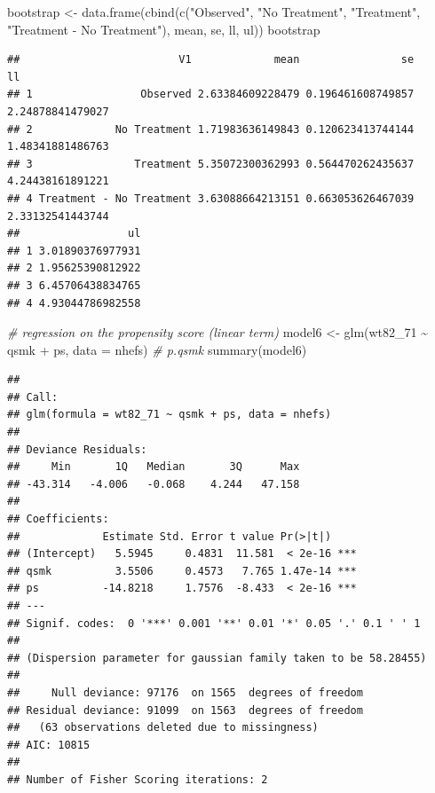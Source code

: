 \documentclass[
  10pt,
]{book}
\newenvironment{Shaded}{\begin{snugshade}}{\end{snugshade}}
\newcommand{\AttributeTok}[1]{\textcolor[rgb]{0.77,0.63,0.00}{#1}}
\newcommand{\CommentTok}[1]{\textcolor[rgb]{0.56,0.35,0.01}{\textit{#1}}}
\newcommand{\FunctionTok}[1]{\textcolor[rgb]{0.00,0.00,0.00}{#1}}
\newcommand{\NormalTok}[1]{#1}
\newcommand{\OtherTok}[1]{\textcolor[rgb]{0.56,0.35,0.01}{#1}}
\newcommand{\SpecialCharTok}[1]{\textcolor[rgb]{0.00,0.00,0.00}{#1}}
\newcommand{\StringTok}[1]{\textcolor[rgb]{0.31,0.60,0.02}{#1}}
\begin{document}
\begin{Shaded}
\begin{Highlighting}[]
\NormalTok{bootstrap }\OtherTok{\textless{}{-}} \FunctionTok{data.frame}\NormalTok{(}\FunctionTok{cbind}\NormalTok{(}\FunctionTok{c}\NormalTok{(}\StringTok{"Observed"}\NormalTok{, }\StringTok{"No Treatment"}\NormalTok{, }\StringTok{"Treatment"}\NormalTok{, }
                                \StringTok{"Treatment {-} No Treatment"}\NormalTok{), mean, se, ll, ul))}
\NormalTok{bootstrap}
\end{Highlighting}
\end{Shaded}

\begin{verbatim}
##                         V1             mean                se               ll
## 1                 Observed 2.63384609228479 0.196461608749857 2.24878841479027
## 2             No Treatment 1.71983636149843 0.120623413744144 1.48341881486763
## 3                Treatment 5.35072300362993 0.564470262435637 4.24438161891221
## 4 Treatment - No Treatment 3.63088664213151 0.663053626467039 2.33132541443744
##                 ul
## 1 3.01890376977931
## 2 1.95625390812922
## 3 6.45706438834765
## 4 4.93044786982558
\end{verbatim}

\begin{Shaded}
\begin{Highlighting}[]
\CommentTok{\# regression on the propensity score (linear term)}
\NormalTok{model6 }\OtherTok{\textless{}{-}} \FunctionTok{glm}\NormalTok{(wt82\_71 }\SpecialCharTok{\textasciitilde{}}\NormalTok{ qsmk }\SpecialCharTok{+}\NormalTok{ ps, }\AttributeTok{data =}\NormalTok{ nhefs) }\CommentTok{\# p.qsmk}
\FunctionTok{summary}\NormalTok{(model6)}
\end{Highlighting}
\end{Shaded}

\begin{verbatim}
## 
## Call:
## glm(formula = wt82_71 ~ qsmk + ps, data = nhefs)
## 
## Deviance Residuals: 
##     Min       1Q   Median       3Q      Max  
## -43.314   -4.006   -0.068    4.244   47.158  
## 
## Coefficients:
##             Estimate Std. Error t value Pr(>|t|)    
## (Intercept)   5.5945     0.4831  11.581  < 2e-16 ***
## qsmk          3.5506     0.4573   7.765 1.47e-14 ***
## ps          -14.8218     1.7576  -8.433  < 2e-16 ***
## ---
## Signif. codes:  0 '***' 0.001 '**' 0.01 '*' 0.05 '.' 0.1 ' ' 1
## 
## (Dispersion parameter for gaussian family taken to be 58.28455)
## 
##     Null deviance: 97176  on 1565  degrees of freedom
## Residual deviance: 91099  on 1563  degrees of freedom
##   (63 observations deleted due to missingness)
## AIC: 10815
## 
## Number of Fisher Scoring iterations: 2
\end{verbatim}
\end{document}
